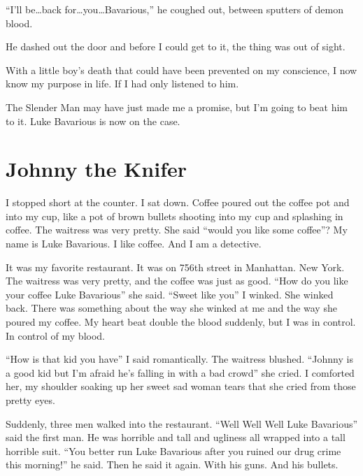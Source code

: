 ``I'll be{\ldots}back
for{\ldots}you{\ldots}Bavarious,'' he coughed out, between
sputters of demon blood.



He dashed out the door and before I could get to it, the thing was
out of sight.



With a little boy's death that could have been prevented on
my conscience, I now know my purpose in life. If I had only
listened to him.



The Slender Man may have just made me a promise, but I'm
going to beat him to it. Luke Bavarious is now on the case. 

 





\chapter{Johnny the Knifer}




I stopped short at the counter. I sat down. Coffee poured out the
coffee pot and into my cup, like a pot of brown bullets shooting
into my cup and splashing in coffee. The waitress was very pretty.
She said ``would you like some coffee''? My name is Luke Bavarious. I
like coffee. And I am a detective.



It was my favorite restaurant. It was on 756th street in Manhattan.
New York. The waitress was very pretty, and the coffee was just as
good. ``How do you like your coffee Luke Bavarious'' she said. ``Sweet
like you'' I winked. She winked back. There was something about the
way she winked at me and the way she poured my coffee. My heart
beat double the blood suddenly, but I was in control. In control of
my blood.



``How is that kid you have'' I said romantically. The waitress
blushed. ``Johnny is a good kid but I'm afraid he's falling in with
a bad crowd'' she cried. I comforted her, my shoulder soaking up her
sweet sad woman tears that she cried from those pretty eyes.



Suddenly, three men walked into the restaurant. ``Well Well Well
Luke Bavarious'' said the first man. He was horrible and tall and
ugliness all wrapped into a tall horrible suit. ``You better run
Luke Bavarious after you ruined our drug crime this morning!'' he
said. Then he said it again. With his guns. And his bullets.



